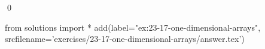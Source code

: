 
\begin{ex}
  \label{ex:23-17-one-dimensional-arrays}
  
  \qed
\end{ex}
\begin{python0}
from solutions import *
add(label="ex:23-17-one-dimensional-arrays",
    srcfilename='exercises/23-17-one-dimensional-arrays/answer.tex')
\end{python0}
